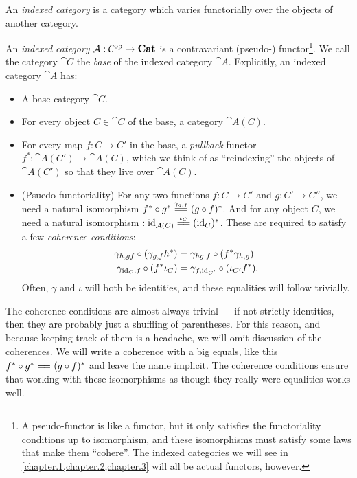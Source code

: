 \documentclass[DynamicalBook]{subfiles}
\begin{document}
An \emph{indexed category} is a category which varies functorially over the
objects of another category.

\begin{definition}
  An \emph{indexed category} $\mathcal{A} : \mathcal{C}^{\textnormal{op}} \to \textbf{Cat}$ is a
  contravariant (pseudo-) functor\footnote{A pseudo-functor is like a functor,
    but it only satisfies the functoriality conditions up to isomorphism, and
    these isomorphisms must satisfy some laws that make them ``cohere''. The
    indexed categories we will see in \cref{chapter.1,chapter.2,chapter.3}
    will all be actual functors, however.}. We call the category $\cat{C}$ the
  \emph{base} of the indexed category $\cat{A}$. Explicitly, an indexed
  category $\cat{A}$ has:
  \begin{itemize}
  \item A base category $\cat{C}$.
  \item For every object $C \in \cat{C}$ of the base, a category $\cat{A}(C)$.
  \item For every map $f : C \to C'$ in the base, a \emph{pullback} functor
    $f^{\ast} : \cat{A}(C') \to \cat{A}(C)$, which we think of as ``reindexing''
    the objects of $\cat{A}(C')$ so that they live over $\cat{A}(C)$.
  \item (Psuedo-functoriality) For any two functions $f : C \to C'$ and $g : C' \to C''$, we need a
    natural isomorphism $f^{\ast} \circ g^{\ast} \xequals{\gamma_{g, f}} (g \circ
    f)^{\ast}$. And for any object $C$, we need a natural isomorphism $:
    \id_{\cat{A}(C)} \xequals{\iota_C } (\id_C)^{\ast}$. These are required to satisfy a
    few \emph{coherence conditions}:
\begin{align}
  \gamma_{h,gf} \circ (\gamma_{g, f}h^{\ast}) &= \gamma_{hg, f} \circ (f^{\ast}\gamma_{h, g}) \\
  \gamma_{\mathrm{id}_C, f} \circ (f^{\ast}\iota_C) &= \gamma_{f, \mathrm{id}_{C'}} \circ (\iota_{C'} f^{\ast}).
\end{align}
   Often, $\gamma$ and $\iota$ will both be identities, and these equalities
   will follow trivially.
  \end{itemize}
\end{definition}

\begin{remark}\label{rmk.coherence_condition_indexed_cat}
  The coherence conditions are almost always trivial --- if not strictly
  identities, then they are probably just a shuffling of parentheses. For this
  reason, and because keeping track of them is a headache, we will omit
  discussion of the coherences. We will write a coherence with a big equals,
  like this $f^{\ast} \circ g^{\ast} \xequals{\phantom{ \gamma_{g, f} }} (g \circ
    f)^{\ast}$ and leave the name implicit. The coherence conditions ensure that
    working with these isomorphisms as though they really were equalities works well.
\end{remark}
\end{document}
